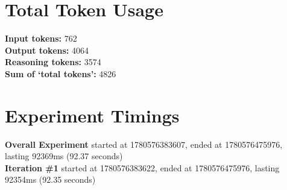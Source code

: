 \documentclass{article}
\begin{document}
\section*{Total Token Usage}
\textbf{Input tokens: }762
\\\textbf{Output tokens: }4064
\\\textbf{Reasoning tokens: }3574
\\\textbf{Sum of `total tokens': }4826
\section*{Experiment Timings}
\textbf{Overall Experiment} started at 1780576383607, ended at 1780576475976, lasting 92369ms (92.37 seconds)
\\\textbf{Iteration \#1} started at 1780576383622, ended at 1780576475976, lasting 92354ms (92.35 seconds)
\end{document}
